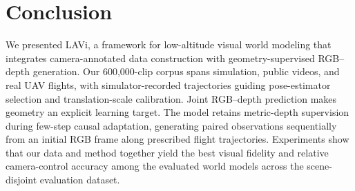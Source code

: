 \section{Conclusion}
\label{sec:conclusion}
We presented LAVi, a framework for low-altitude visual world modeling that integrates camera-annotated data construction with geometry-supervised RGB--depth generation.
Our 600,000-clip corpus spans simulation, public videos, and real UAV flights, with simulator-recorded trajectories guiding pose-estimator selection and translation-scale calibration.
Joint RGB--depth prediction makes geometry an explicit learning target.
The model retains metric-depth supervision during few-step causal adaptation, generating paired observations sequentially from an initial RGB frame along prescribed flight trajectories.
Experiments show that our data and method together yield the best visual fidelity and relative camera-control accuracy among the evaluated world models across the scene-disjoint evaluation dataset.
